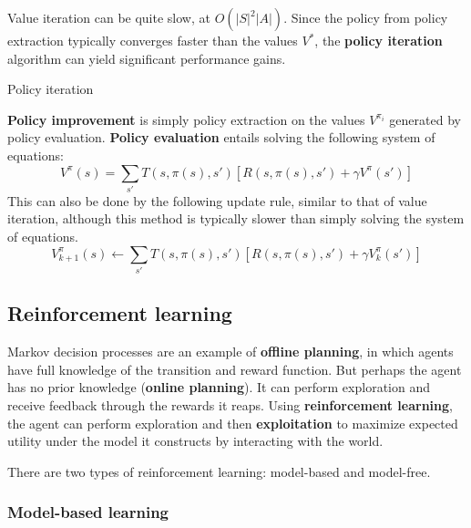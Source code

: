 \documentclass[12pt]{article}
\begin{document}
Value iteration can be quite slow, at $O(|S|^2|A|)$. Since the policy from policy extraction typically converges faster than the values $V^*$, the \textbf{policy iteration} algorithm can yield significant performance gains.
\begin{algorithm}[h]
\caption{Policy iteration}


\end{algorithm}
\textbf{Policy improvement} is simply policy extraction on the values $V^{\pi_i}$ generated by policy evaluation. \textbf{Policy evaluation} entails solving the following system of equations:
\[ V^\pi(s) = \sum_{s'} T(s, \pi(s), s') \left[ R(s, \pi(s), s') + \gamma V^\pi(s') \right] \]
This can also be done by the following update rule, similar to that of value iteration, although this method is typically slower than simply solving the system of equations.
\[ V^\pi_{k + 1}(s) \gets \sum_{s'} T(s, \pi(s), s') \left[ R(s, \pi(s), s') + \gamma V^\pi_k(s') \right] \]

\subsection{Reinforcement learning}

Markov decision processes are an example of \textbf{offline planning}, in which agents have full knowledge of the transition and reward function. But perhaps the agent has no prior knowledge (\textbf{online planning}). It can perform exploration and receive feedback through the rewards it reaps. Using \textbf{reinforcement learning}, the agent can perform exploration and then \textbf{exploitation} to maximize expected utility under the model it constructs by interacting with the world.

There are two types of reinforcement learning: model-based and model-free.

\subsubsection{Model-based learning}
\end{document}
